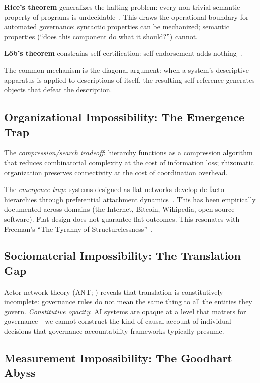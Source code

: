 \documentclass[12pt,a4paper]{article}
\begin{document}
\textbf{Rice's theorem} generalizes the halting problem: every non-trivial
semantic property of programs is undecidable~\cite{Rice1953}. This draws the
operational boundary for automated governance: syntactic properties can be
mechanized; semantic properties (``does this component do what it should?'')
cannot.

\textbf{L\"{o}b's theorem} constrains self-certification:
self-endorsement adds nothing~\cite{Lob1955}.

The common mechanism is the diagonal argument: when a system's descriptive
apparatus is applied to descriptions of itself, the resulting self-reference
generates objects that defeat the description.

\subsection{Organizational Impossibility: The Emergence Trap}

The \emph{compression/search tradeoff}: hierarchy functions as a compression
algorithm that reduces combinatorial complexity at the cost of information
loss; rhizomatic organization preserves connectivity at the cost of
coordination overhead.

The \emph{emergence trap}: systems designed as flat networks develop de facto
hierarchies through preferential attachment
dynamics~\cite{BarabasiAlbert1999}. This has been empirically documented
across domains (the Internet, Bitcoin, Wikipedia, open-source software). Flat
design does not guarantee flat outcomes. This resonates with Freeman's
``The Tyranny of Structurelessness''~\cite{Freeman1972}.

\subsection{Sociomaterial Impossibility: The Translation Gap}

Actor-network theory (ANT; \cite{Callon1986,Latour2005}) reveals that
translation is constitutively incomplete: governance rules do not mean the
same thing to all the entities they govern. \emph{Constitutive opacity}: AI
systems are opaque at a level that matters for governance---we cannot construct
the kind of causal account of individual decisions that governance
accountability frameworks typically presume.

\subsection{Measurement Impossibility: The Goodhart Abyss}
\end{document}

